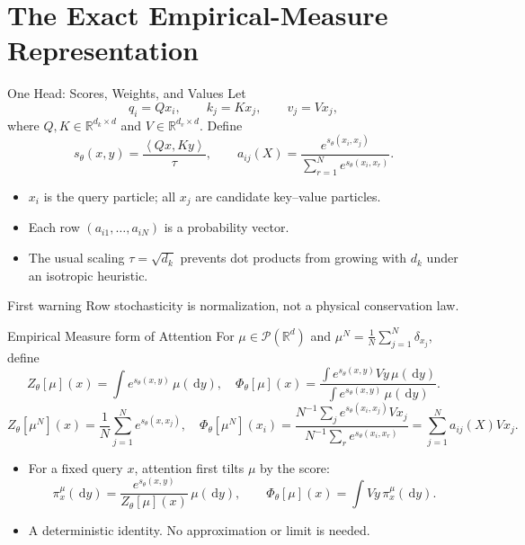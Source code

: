 \documentclass[aspectratio=169,11pt]{beamer}
\newcommand{\R}{\mathbb{R}}
\newcommand{\cP}{\mathcal{P}}
\newcommand{\dd}{\,\mathrm{d}}
\newcommand{\ip}[2]{\left\langle#1,#2\right\rangle}
\begin{document}
\section{The Exact Empirical-Measure Representation}

\begin{frame}{One Head: Scores, Weights, and Values}
Let
\[
 q_i=Qx_i,\qquad k_j=Kx_j,\qquad v_j=Vx_j,
\]
where $Q,K\in\R^{d_k\times d}$ and $V\in\R^{d_v\times d}$.  Define
\[
 s_\theta(x,y)=\frac{\ip{Qx}{Ky}}{\tau},
 \qquad
 a_{ij}(X)=\frac{e^{s_\theta(x_i,x_j)}}
                  {\sum_{r=1}^N e^{s_\theta(x_i,x_r)}}.
\]

\begin{itemize}
\item $x_i$ is the query particle; all $x_j$ are candidate key--value particles.
\item Each row $(a_{i1},\ldots,a_{iN})$ is a probability vector.
\item The usual scaling $\tau=\sqrt{d_k}$ prevents dot products from growing with $d_k$ under an isotropic heuristic.
\end{itemize}

\begin{alertblock}{First warning}
Row stochasticity is normalization, not a physical conservation law.
\end{alertblock}
\end{frame}


\begin{frame}{Empirical Measure form of Attention}
For $\mu\in\cP(\R^d)$ and  $\mu^N=\frac1N\sum_{j=1}^N\delta_{x_j}$, define
\[
 Z_\theta[\mu](x)
 =\int e^{s_\theta(x,y)}\,\mu(\dd y),
\quad  
 \Phi_\theta[\mu](x)
 =\frac{\displaystyle\int e^{s_\theta(x,y)}Vy\,\mu(\dd y)}
        {\displaystyle\int e^{s_\theta(x,y)}\,\mu(\dd y)}.
\]
\[ 
 Z_\theta[\mu^N](x)=\frac1N\sum_{j=1}^N e^{s_\theta(x,x_j)},
\quad 
 \Phi_\theta[\mu^N](x_i)
 =\frac{N^{-1}\sum_j e^{s_\theta(x_i,x_j)}Vx_j}
        {N^{-1}\sum_r e^{s_\theta(x_i,x_r)}}
 =\sum_{j=1}^N a_{ij}(X)Vx_j.
\]

\begin{itemize}
  \item  
For a fixed query $x$, attention first tilts $\mu$ by the score:
\[
 \pi_x^\mu(\dd y)
 =\frac{e^{s_\theta(x,y)}}{Z_\theta[\mu](x)}\,\mu(\dd y),
 \qquad
 \Phi_\theta[\mu](x)=\int Vy\,\pi_x^\mu(\dd y).
\]
\item A deterministic identity. No approximation or limit is needed. 
\end{itemize}
\end{frame}
\end{document}
